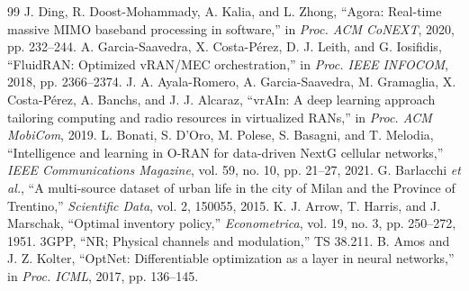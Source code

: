 \begin{thebibliography}{99}
 J. Ding, R. Doost-Mohammady, A. Kalia, and L. Zhong, ``Agora: Real-time massive MIMO baseband processing in software,'' in \emph{Proc. ACM CoNEXT}, 2020, pp. 232--244.
 A. Garcia-Saavedra, X. Costa-P\'erez, D. J. Leith, and G. Iosifidis, ``FluidRAN: Optimized vRAN/MEC orchestration,'' in \emph{Proc. IEEE INFOCOM}, 2018, pp. 2366--2374.
 J. A. Ayala-Romero, A. Garcia-Saavedra, M. Gramaglia, X. Costa-P\'erez, A. Banchs, and J. J. Alcaraz, ``vrAIn: A deep learning approach tailoring computing and radio resources in virtualized RANs,'' in \emph{Proc. ACM MobiCom}, 2019.
 L. Bonati, S. D'Oro, M. Polese, S. Basagni, and T. Melodia, ``Intelligence and learning in O-RAN for data-driven NextG cellular networks,'' \emph{IEEE Communications Magazine}, vol. 59, no. 10, pp. 21--27, 2021.
 G. Barlacchi \emph{et al.}, ``A multi-source dataset of urban life in the city of Milan and the Province of Trentino,'' \emph{Scientific Data}, vol. 2, 150055, 2015.
 K. J. Arrow, T. Harris, and J. Marschak, ``Optimal inventory policy,'' \emph{Econometrica}, vol. 19, no. 3, pp. 250--272, 1951.
 3GPP, ``NR; Physical channels and modulation,'' TS 38.211.
 B. Amos and J. Z. Kolter, ``OptNet: Differentiable optimization as a layer in neural networks,'' in \emph{Proc. ICML}, 2017, pp. 136--145.
\end{thebibliography}
